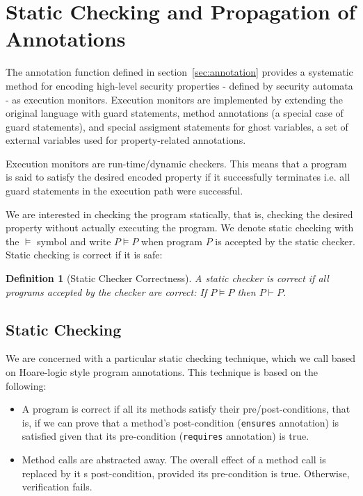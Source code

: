 \documentclass[10pt,notitlepage,twoside]{article}
\newtheorem{definition}{Definition}
\begin{document}
\section{Static Checking and Propagation of Annotations}\label{sec:propagation}

The annotation function defined in section~\ref{sec:annotation} provides a systematic method for encoding high-level security properties - defined by security automata - as execution monitors.
Execution monitors are implemented by extending the original language with guard statements, method annotations (a special case of guard statements), and special assigment statements for ghost variables, a set of external variables used for property-related annotations.

Execution monitors are run-time/dynamic checkers. This means that a program is said to satisfy  the desired encoded property if it successfully terminates  i.e. all guard statements in the execution path were successful.

We are interested in checking the program statically, that is, checking the desired property without actually executing the program. We denote static checking with the $\models$ symbol and write $P \models P$ when program $P$ is accepted by the static checker.
Static checking is correct if it is safe:

\begin{definition}[Static Checker Correctness]
A static checker is correct if all programs accepted by the checker are correct: If $P \models P$ then $P \vdash P$.
\end{definition}

\subsection{Static Checking}

We are concerned with a particular static checking technique, which we call based on Hoare-logic style program annotations.
This technique is based on the following:
\begin{itemize}
\item A program is correct if all its methods satisfy their pre/post-conditions, that is, if we can prove that a method's post-condition (\texttt{ensures} annotation) is satisfied given that its pre-condition (\texttt{requires} annotation)  is true.
\item Method calls are abstracted away. The overall effect of a method call is replaced by it s post-condition, provided its pre-condition is true. Otherwise, verification fails.
\end{itemize}
\end{document}
